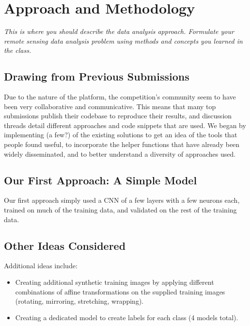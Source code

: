 \section{Approach and Methodology}
\textit{This is where you should describe the data analysis approach. Formulate your remote sensing data analysis problem using methods and concepts you learned in the class. }

\subsection{Drawing from Previous Submissions}
Due to the nature of the platform, the competition's community seem to have been very collaborative and communicative. This means that many top submissions publish their codebase to reproduce their results, and discussion threads detail different approaches and code snippets that are used. We began by implementing (a few?) of the existing solutions to get an idea of the tools that people found useful, to incorporate the helper functions that have already been widely disseminated, and to better understand a diversity of approaches used.  

\subsection{Our First Approach: A Simple Model}
Our first approach simply used a CNN of a few layers with a few neurons each, trained on much of the training data, and validated on the rest of the training data. 

\subsection{Other Ideas Considered}
Additional ideas include: 
\begin{itemize}
    \item Creating additional synthetic training images by applying different combinations of affine transformations on the supplied training images (rotating, mirroring, stretching, wrapping). 
    \item Creating a dedicated model to create labels for each class (4 models total).
\end{itemize}